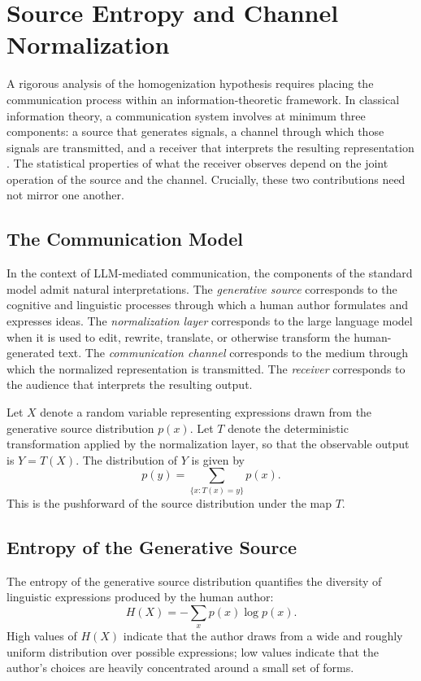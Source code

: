 \documentclass[12pt,a4paper]{article}
\theoremstyle{definition}
\theoremstyle{plain}
\theoremstyle{remark}
\begin{document}
\section{Source Entropy and Channel Normalization}
\label{sec:sourceentropy}

A rigorous analysis of the homogenization hypothesis requires placing the communication
process within an information-theoretic framework. In classical information theory, a
communication system involves at minimum three components: a source that generates signals,
a channel through which those signals are transmitted, and a receiver that interprets the
resulting representation \citep{shannon1948}. The statistical properties of what the receiver
observes depend on the joint operation of the source and the channel. Crucially, these two
contributions need not mirror one another.

\subsection{The Communication Model}

In the context of LLM-mediated communication, the components of the standard model admit
natural interpretations. The \emph{generative source} corresponds to the cognitive and
linguistic processes through which a human author formulates and expresses ideas. The
\emph{normalization layer} corresponds to the large language model when it is used to edit,
rewrite, translate, or otherwise transform the human-generated text. The
\emph{communication channel} corresponds to the medium through which the normalized
representation is transmitted. The \emph{receiver} corresponds to the audience that
interprets the resulting output.

Let $X$ denote a random variable representing expressions drawn from the generative source
distribution $p(x)$. Let $T$ denote the deterministic transformation applied by the
normalization layer, so that the observable output is $Y = T(X)$. The distribution of $Y$ is
given by
\[
p(y) = \sum_{\{x : T(x) = y\}} p(x).
\]
This is the pushforward of the source distribution under the map $T$.

\subsection{Entropy of the Generative Source}

The entropy of the generative source distribution quantifies the diversity of linguistic
expressions produced by the human author:
\[
H(X) = -\sum_x p(x)\log p(x).
\]
High values of $H(X)$ indicate that the author draws from a wide and roughly uniform
distribution over possible expressions; low values indicate that the author's choices are
heavily concentrated around a small set of forms.
\end{document}
